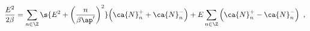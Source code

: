 \begin{equation}
\frac{E^2}{2\beta} = 
\sum_{n \in \Z} \s{E^2 + \left( \frac{n}{\beta \ap'} \right)^2 } 
\Big( \ca{N}^+_n + \ca{N}^-_n  \Big) 
+ E \sum_{n \in \Z} 
\left( \ca{N}^+_n - \ca{N}^-_n \right)\ ,
\end{equation}

